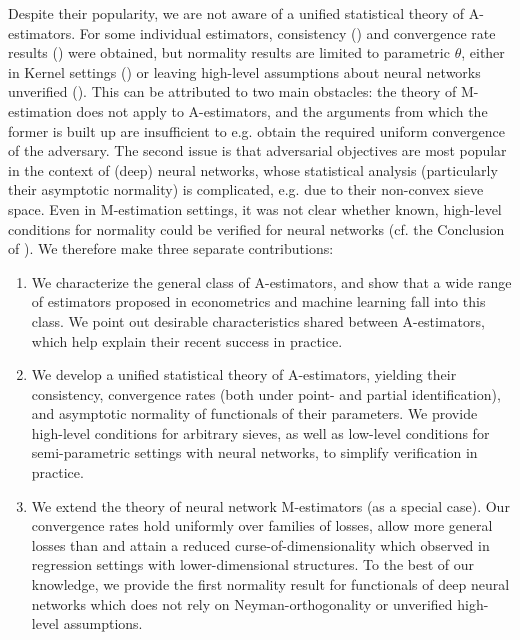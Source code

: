 \documentclass[12pt]{article}
\theoremstyle{myplain}
\theoremstyle{definition}
\theoremstyle{definition}
\theoremstyle{remark}
\numberwithin{equation}{section}
\begin{document}
Despite their popularity, we are not aware of a unified statistical theory of A-estimators. For some individual estimators, consistency (\cite{deepGMM2019}) and convergence rate results (\cite{dikkala2020minimax, singh2018nonparametric,liang2018HowWell,belomestny2021rates}) were obtained, but normality results are limited to parametric $\theta$, either in Kernel settings (\cite{variationalMM2020}) or leaving high-level assumptions about neural networks unverified (\cite{kaji2020adversarial}). This can be attributed to two main obstacles: the theory of M-estimation does not apply to A-estimators, and the arguments from which the former is built up are insufficient to e.g. obtain the required uniform convergence of the adversary. The second issue is that adversarial objectives are most popular in the context of (deep) neural networks, whose statistical analysis (particularly their asymptotic normality) is complicated, e.g. due to their non-convex sieve space. Even in M-estimation settings, it was not clear whether known, high-level conditions for normality could be verified for neural networks (cf. the Conclusion of \cite{shen2019asymptotic}). We therefore make three separate contributions:
\begin{enumerate}
    \item We characterize the general class of A-estimators, and show that a wide range of estimators proposed in econometrics and machine learning fall into this class. We point out desirable characteristics shared between A-estimators, which help explain their recent success in practice.  
    \item We develop a unified statistical theory of A-estimators, yielding their consistency, convergence rates (both under point- and partial identification), and asymptotic normality of functionals of their parameters. We provide high-level conditions for arbitrary sieves, as well as low-level conditions for semi-parametric settings with neural networks, to simplify verification in practice.
    \item  We extend the theory of neural network M-estimators (as a special case). Our convergence rates hold uniformly over families of losses, allow more general losses than \cite{farrell2018deep} and attain a reduced curse-of-dimensionality which \cite{minkowski, bauer2019deep} observed in regression settings with lower-dimensional structures. To the best of our knowledge, we provide the first normality result for functionals of deep neural networks which does not rely on Neyman-orthogonality or unverified high-level assumptions.
\end{enumerate}
\end{document}
